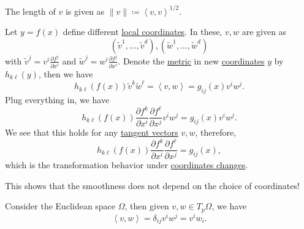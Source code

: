 \begin{remark}
	The length of \(v\) is given as \(\lVert v \rVert \coloneqq \left\langle v, v \right\rangle ^{1 / 2}\).
\end{remark}

Let \(y = f(x)\) define different \hyperref[def:coordinate-chart]{local coordinates}. In these, \(v, w\) are given as
\[
	(\widetilde{v} ^1, \ldots , \widetilde{v} ^d), (\widetilde{w} ^1, \ldots , \widetilde{w} ^d)
\]
with \(\widetilde{v} ^j = v^i \frac{\partial f^j}{\partial x^i} \) and \(\widetilde{w} ^j = w^i \frac{\partial f^j}{\partial x^i} \). Denote the \hyperref[def:Riemannian-metric]{metric} in new \hyperref[def:coordinate-chart]{coordinates} \(y\) by \(h_{k \ell }(y)\), then we have
\[
	h_{k \ell }(f(x))\widetilde{v} ^k \widetilde{w} ^\ell
	= \left\langle v, w \right\rangle
	= g_{ij}(x)v^i w^j .
\]
Plug everything in, we have
\[
	h_{k \ell }(f(x)) \frac{\partial f^k}{\partial x^i} \frac{\partial f^{\ell } }{\partial x^j} v^i w^j
	= g_{ij}(x) v^i w^j.
\]
We see that this holds for any \hyperref[def:tangent-vector]{tangent vectors} \(v, w\), therefore,
\[
	h_{k \ell }(f(x)) \frac{\partial f^k}{\partial x^i} \frac{\partial f^{\ell } }{\partial x^j} = g_{ij} (x),
\]
which is the transformation behavior under \hyperref[def:coordinate-transition]{coordinates changes}.

\begin{remark}
	This shows that the smoothness does not depend on the choice of coordinates!
\end{remark}

\begin{eg}
	Consider the Euclidean space \(\Omega \), then given \(v, w\in T_p \Omega \), we have
	\[
		\left\langle v, w \right\rangle
		= \delta _{ij} v^i w^j
		= v^i w_i.
	\]
\end{eg}

